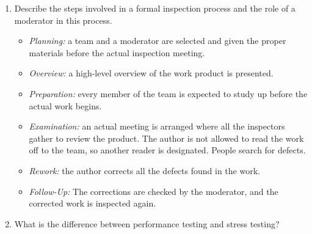 \documentclass[11pt]{article}
\begin{document}
\begin{enumerate}
        \item Describe the steps involved in a formal inspection process and the role of a moderator in this process.
        \begin{itemize}
        \item \textit{Planning: } a team and a moderator are selected and given the proper materials before the actual inspection meeting.
        \item \textit{Overview: } a high-level overview of the work product is presented.
        \item \textit{Preparation: } every member of the team is expected to study up before the actual work begins.
        \item \textit{Examination: } an actual meeting is arranged where all the inspectors gather to review the product. The author is not allowed to read the work off to the team, so another reader is designated. People search for defects. 
        \item \textit{Rework: } the author corrects all the defects found in the work. 
        \item \textit{Follow-Up: } The corrections are checked by the moderator, and the corrected work is inspected again.
        \end{itemize}
        
        \item What is the difference between performance testing and stress testing? 
        
        
    \end{enumerate}
    
    
\end{document}
